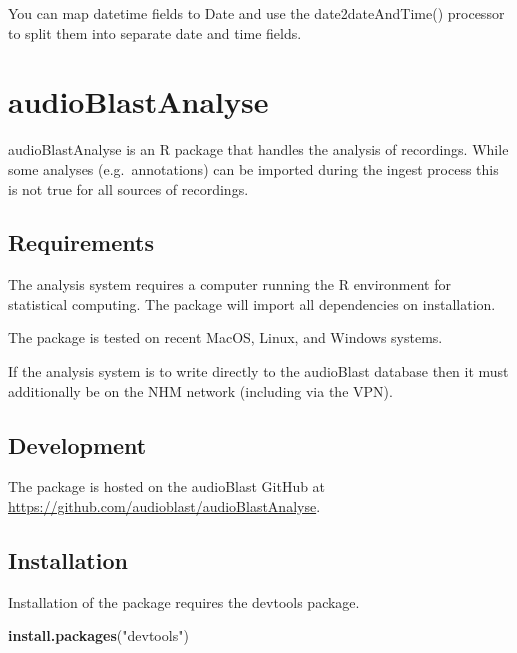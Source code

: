 \documentclass[
]{book}
\newenvironment{Shaded}{\begin{snugshade}}{\end{snugshade}}
\newcommand{\FunctionTok}[1]{\textcolor[rgb]{0.13,0.29,0.53}{\textbf{#1}}}
\newcommand{\NormalTok}[1]{#1}
\newcommand{\StringTok}[1]{\textcolor[rgb]{0.31,0.60,0.02}{#1}}
\begin{document}
You can map datetime fields to Date and use the date2dateAndTime() processor to split them into separate date and time fields.

\hypertarget{audioblastanalyse}{%
\chapter{audioBlastAnalyse}\label{audioblastanalyse}}

audioBlastAnalyse is an R package that handles the analysis of recordings. While some analyses (e.g.~annotations) can be imported during the ingest process this is not true for all sources of recordings.

\hypertarget{requirements}{%
\section{Requirements}\label{requirements}}

The analysis system requires a computer running the R environment for statistical computing. The package will import all dependencies on installation.

The package is tested on recent MacOS, Linux, and Windows systems.

If the analysis system is to write directly to the audioBlast database then it must additionally be on the NHM network (including via the VPN).

\hypertarget{development}{%
\section{Development}\label{development}}

The package is hosted on the audioBlast GitHub at \url{https://github.com/audioblast/audioBlastAnalyse}.

\hypertarget{installation}{%
\section{Installation}\label{installation}}

Installation of the package requires the devtools package.

\begin{Shaded}
\begin{Highlighting}[]
\FunctionTok{install.packages}\NormalTok{(}\StringTok{"devtools"}\NormalTok{)}
\end{Highlighting}
\end{Shaded}
\end{document}
